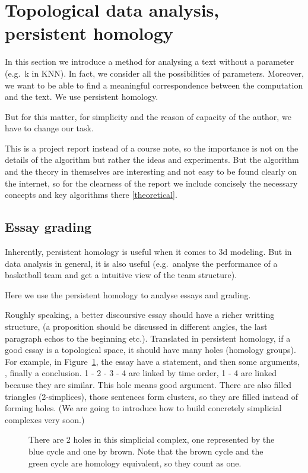 \section{Topological data analysis, persistent homology}

In this section we introduce a method for analysing a text
without a parameter (e.g.\ k in KNN). In fact, we consider all
the possibilities of parameters. Moreover, we want to be able to
find a meaningful correspondence between the computation and
the text. We use persistent homology.

But for this matter, for simplicity and the reason of capacity
of the author, we have to change our task.

This is a project report instead of a course note, so the importance
is not on the details of the algorithm but rather the ideas and experiments.
But the algorithm and the theory in themselves are interesting and not
easy to be found clearly on the internet, so for the clearness of the report
we include concisely the necessary
concepts and key algorithms there \ref{theoretical}.

\subsection{Essay grading}

Inherently, persistent homology is useful when it comes to 3d modeling.
But in data analysis in general, it is also useful (e.g.\ analyse the
performance of a basketball team and get a intuitive view of the team structure).

Here we use the persistent homology to analyse essays and grading.

Roughly speaking, a better discoursive essay should have a
richer writting structure, (a proposition should be discussed
in different angles, the last paragraph echos to the beginning etc.).
Translated in persistent homology,
if a good essay is a topological space, it should have
many holes (homology groups). For example,
in Figure~\ref{apple}, the essay have a statement, and then some arguments,
, finally a conclusion. 1 - 2 - 3 - 4 are linked by time order, 1 - 4 are linked because they are similar.
This hole means good argument. There are also filled triangles (2-simplices), those
sentences form clusters, so they are filled instead of forming holes.
(We are going to introduce how to build concretely simplicial complexes very soon.)

\begin{figure}[H]
  \centering
  
  \caption{There are 2 holes in this simplicial complex,
  one represented by the blue cycle and one by brown.
  Note that the brown cycle and the green cycle are homology equivalent, so they count as one.}
  \label{apple}
\end{figure}

